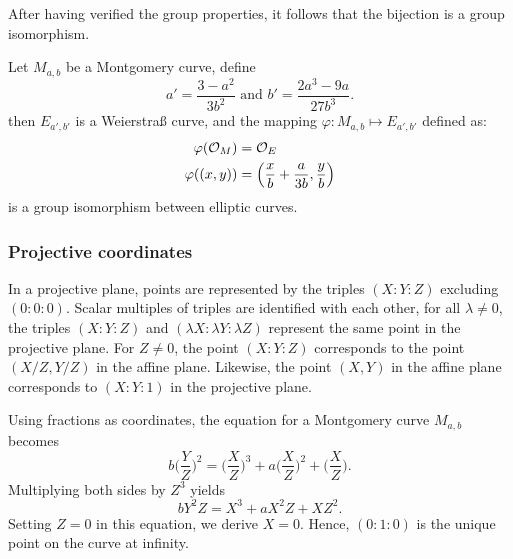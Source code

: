 After having verified the group properties, it follows that the bijection is a group isomorphism.
\begin{lemma}
  \label{lemma:bij-ecc}
  Let $M_{a,b}$ be a Montgomery curve, define
  $$a' = \frac{3-a^2}{3b^2} \text{\ \ \ \ and\ \ \ \ } b' = \frac{2a^3 - 9a}{27b^3}.$$
  then $E_{a',b'}$ is a Weierstra{\ss} curve, and the mapping
  $\varphi : M_{a,b} \mapsto E_{a',b'}$ defined as:
  \begin{align*}
    \varphi(\mathcal{O}_M)   & = \mathcal{O}_E                                                 \\
    \varphi( (x , y) ) & = \left( \frac{x}{b} + \frac{a}{3b} , \frac{y}{b} \right)
  \end{align*}
  is a group isomorphism between elliptic curves.
\end{lemma}



\subsubsection{Projective coordinates}
\label{subsec:ECC-projective}

In a projective plane, points are represented by the triples $(X:Y:Z)$ excluding $(0:0:0)$.
Scalar multiples of triples are identified with each other, \ie
for all $\lambda \neq 0$, the triples $(X:Y:Z)$ and $(\lambda X:\lambda Y:\lambda Z)$ represent
the same point in the projective plane.
For $Z\neq 0$, the point $(X:Y:Z)$ corresponds to the
point $(X/Z,Y/Z)$ in the affine plane.
Likewise, the point $(X,Y)$ in the affine plane corresponds to $(X:Y:1)$ in the projective plane.

Using fractions as coordinates, the equation for a Montgomery curve $M_{a,b}$
becomes
$$b \bigg(\frac{Y}{Z}\bigg)^2 = \bigg(\frac{X}{Z}\bigg)^3 + a \bigg(\frac{X}{Z}\bigg)^2 + \bigg(\frac{X}{Z}\bigg).$$
Multiplying both sides by $Z^3$ yields
$$b Y^2Z = X^3 + a X^2Z + XZ^2.$$
Setting $Z = 0$ in this equation, we derive $X = 0$.
Hence, $(0 : 1 : 0)$ is the unique point on the curve at infinity.

